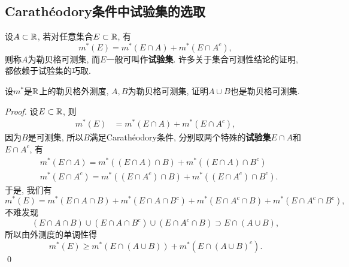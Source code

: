 \subsection{Carath\'eodory条件中试验集的选取}
设$A \subset \mathbb{R}$, 若对任意集合$E \subset \mathbb{R}$, 有
\begin{equation}
    m^*(E) = m^*(E \cap A) + m^*(E \cap A^c), 
\end{equation}
则称$A$为勒贝格可测集, 而$E$一般可叫作\textbf{试验集}. 许多关于集合可测性结论的证明, 都依赖于试验集的巧取. 
\begin{exercise}[~(复习)]
    设$m^*$是$\mathbb{R}$上的勒贝格外测度, $A,B$为勒贝格可测集, 证明$A \cup B$也是勒贝格可测集. 
\end{exercise}
\begin{proof}
    设$E \subset \mathbb{R}$, 则
    \begin{align*}
    m^*(E) &= m^*(E \cap A) + m^*(E \cap A^c),
    \end{align*}
    因为$B$是可测集, 所以$B$满足Carath\'eodory条件, 分别取两个特殊的\textbf{试验集}$E \cap A$和$E \cap A^c$, 有
    \begin{align*}
    &m^*(E \cap A) = m^*((E \cap A) \cap B) + m^*((E \cap A) \cap B^c) \\
    &m^*(E \cap A^c) = m^*((E \cap A^c) \cap B) + m^*((E \cap A^c) \cap B^c).
    \end{align*}
    于是, 我们有
    $$ m^*(E) =  m^*(E \cap A \cap B) + m^*(E \cap A \cap B^c) + 
    m^*(E \cap A^c \cap B) + m^*(E \cap A^c \cap B^c), $$
    不难发现
    $$(E \cap A \cap B) \cup (E \cap A \cap B^c) \cup (E \cap A^c \cap B) \supset E \cap (A \cup B), $$
    所以由外测度的单调性得
    $$ m^*(E) \geq m^*(E \cap (A \cup B)) + m^*(E \cap (A \cup B)^c). $$
    \qed 
\end{proof}



